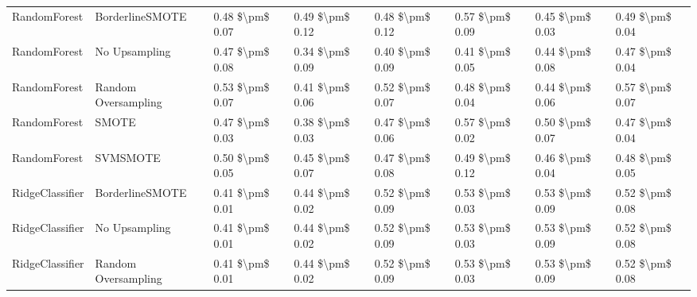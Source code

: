 \begin{tabular}{llllllll}
                   RandomForest &               BorderlineSMOTE & 0.48 \$\textbackslash pm\$ 0.07 &           0.49 \$\textbackslash pm\$ 0.12 &       0.48 \$\textbackslash pm\$ 0.12 &        0.57 \$\textbackslash pm\$ 0.09 &                         0.45 \$\textbackslash pm\$ 0.03 &     0.49 \$\textbackslash pm\$ 0.04 \\
                   RandomForest &                 No Upsampling & 0.47 \$\textbackslash pm\$ 0.08 &           0.34 \$\textbackslash pm\$ 0.09 &       0.40 \$\textbackslash pm\$ 0.09 &        0.41 \$\textbackslash pm\$ 0.05 &                         0.44 \$\textbackslash pm\$ 0.08 &     0.47 \$\textbackslash pm\$ 0.04 \\
                   RandomForest &           Random Oversampling & 0.53 \$\textbackslash pm\$ 0.07 &           0.41 \$\textbackslash pm\$ 0.06 &       0.52 \$\textbackslash pm\$ 0.07 &        0.48 \$\textbackslash pm\$ 0.04 &                         0.44 \$\textbackslash pm\$ 0.06 &     0.57 \$\textbackslash pm\$ 0.07 \\
                   RandomForest &                         SMOTE & 0.47 \$\textbackslash pm\$ 0.03 &           0.38 \$\textbackslash pm\$ 0.03 &       0.47 \$\textbackslash pm\$ 0.06 &        0.57 \$\textbackslash pm\$ 0.02 &                         0.50 \$\textbackslash pm\$ 0.07 &     0.47 \$\textbackslash pm\$ 0.04 \\
                   RandomForest &                      SVMSMOTE & 0.50 \$\textbackslash pm\$ 0.05 &           0.45 \$\textbackslash pm\$ 0.07 &       0.47 \$\textbackslash pm\$ 0.08 &        0.49 \$\textbackslash pm\$ 0.12 &                         0.46 \$\textbackslash pm\$ 0.04 &     0.48 \$\textbackslash pm\$ 0.05 \\
                RidgeClassifier &               BorderlineSMOTE & 0.41 \$\textbackslash pm\$ 0.01 &           0.44 \$\textbackslash pm\$ 0.02 &       0.52 \$\textbackslash pm\$ 0.09 &        0.53 \$\textbackslash pm\$ 0.03 &                         0.53 \$\textbackslash pm\$ 0.09 &     0.52 \$\textbackslash pm\$ 0.08 \\
                RidgeClassifier &                 No Upsampling & 0.41 \$\textbackslash pm\$ 0.01 &           0.44 \$\textbackslash pm\$ 0.02 &       0.52 \$\textbackslash pm\$ 0.09 &        0.53 \$\textbackslash pm\$ 0.03 &                         0.53 \$\textbackslash pm\$ 0.09 &     0.52 \$\textbackslash pm\$ 0.08 \\
                RidgeClassifier &           Random Oversampling & 0.41 \$\textbackslash pm\$ 0.01 &           0.44 \$\textbackslash pm\$ 0.02 &       0.52 \$\textbackslash pm\$ 0.09 &        0.53 \$\textbackslash pm\$ 0.03 &                         0.53 \$\textbackslash pm\$ 0.09 &     0.52 \$\textbackslash pm\$ 0.08 \\

\end{tabular}
